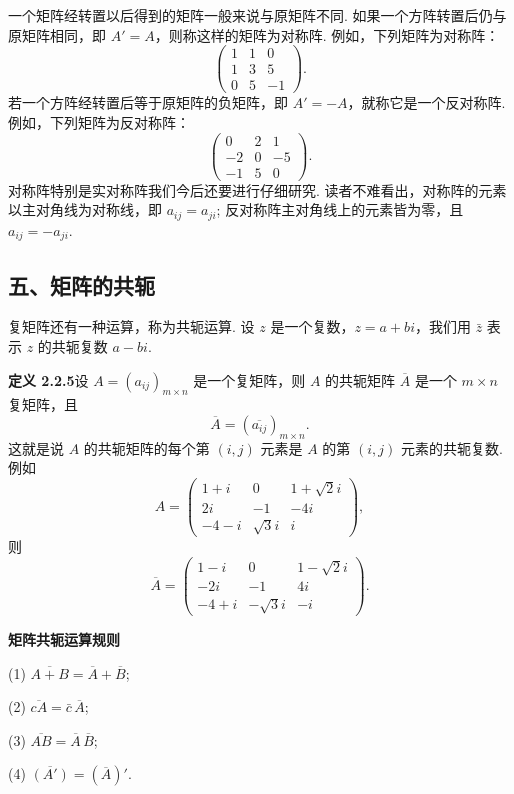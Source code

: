 \documentclass[UTF8, 12pt, fontset=fandol, oneside]{ctexart}
\begin{document}
一个矩阵经转置以后得到的矩阵一般来说与原矩阵不同. 如果一个方阵转置后仍与原矩阵相同，即 $A'=A$，则称这样的矩阵为对称阵. 例如，下列矩阵为对称阵：
\[
\left(\begin{array}{ccc}
1 & 1 & 0\\
1 & 3 & 5\\
0 & 5 & -1
\end{array}\right).
\]
若一个方阵经转置后等于原矩阵的负矩阵，即 $A'=-A$，就称它是一个反对称阵. 例如，下列矩阵为反对称阵：
\[
\left(\begin{array}{ccc}
0 & 2 & 1\\
-2 & 0 & -5\\
-1 & 5 & 0
\end{array}\right).
\]
对称阵特别是实对称阵我们今后还要进行仔细研究. 读者不难看出，对称阵的元素以主对角线为对称线，即 $a_{ij}=a_{ji}$; 反对称阵主对角线上的元素皆为零，且 $a_{ij}=-a_{ji}$.

\subsection*{五、矩阵的共轭}

复矩阵还有一种运算，称为共轭运算. 设 $z$ 是一个复数，$z=a+bi$，我们用 $\bar z$ 表示 $z$ 的共轭复数 $a-bi$.

\noindent\textbf{定义 2.2.5}\quad 设 $A=(a_{ij})_{m\times n}$ 是一个复矩阵，则 $A$ 的共轭矩阵 $\overline{A}$ 是一个 $m\times n$ 复矩阵，且
\[
\overline{A}=(\overline{a_{ij}})_{m\times n}.
\]
这就是说 $A$ 的共轭矩阵的每个第 $(i,j)$ 元素是 $A$ 的第 $(i,j)$ 元素的共轭复数. 例如
\[
A=\left(\begin{array}{ccc}
1+i & 0 & 1+\sqrt{2}i\\
2i & -1 & -4i\\
-4-i & \sqrt{3}i & i
\end{array}\right),
\]
则
\[
\overline{A}=\left(\begin{array}{ccc}
1-i & 0 & 1-\sqrt{2}i\\
-2i & -1 & 4i\\
-4+i & -\sqrt{3}i & -i
\end{array}\right).
\]

\noindent\textbf{矩阵共轭运算规则}

(1) $\overline{A+B}=\overline{A}+\overline{B}$;

(2) $\overline{cA}=\bar c\,\overline{A}$;

(3) $\overline{AB}=\overline{A}\,\overline{B}$;

(4) $\overline{(A')}=(\overline{A})'$.
\end{document}
